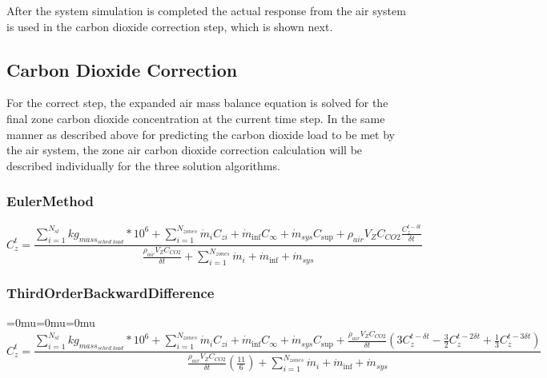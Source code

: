 After the system simulation is completed the actual response from the air system is used in the carbon dioxide correction step, which is shown next.

\subsection{Carbon Dioxide Correction}\label{carbon-dioxide-correction}

For the correct step, the expanded air mass balance equation is solved for the final zone carbon dioxide concentration at the current time step. In the same manner as described above for predicting the carbon dioxide load to be met by the air system, the zone air carbon dioxide correction calculation will be described individually for the three solution algorithms.

\subsubsection{EulerMethod}\label{eulermethod-1}

\begin{equation}
C_z^t = \frac{{\sum\limits_{i = 1}^{{N_{sl}}} {k{g_{mas{s_{sched\;load}}}}*{{10}^6}}  + \sum\limits_{i = 1}^{{N_{zones}}} {{{\dot m}_i}} {C_{zi}} + {{\dot m}_{\inf }}{C_\infty } + {{\dot m}_{sys}}{C_{\sup }} + {\rho_{air}}{V_Z}{C_{CO2}}\frac{{C_z^{t - \delta t}}}{{\delta t}}}}{{\frac{{{\rho_{air}}{V_Z}{C_{CO2}}}}{{\delta t}} + \sum\limits_{i = 1}^{{N_{zones}}} {{{\dot m}_i}}  + {{\dot m}_{\inf }} + {{\dot m}_{sys}}}}
\end{equation}

\subsubsection{ThirdOrderBackwardDifference}\label{thirdorderbackwarddifference-1}

{\medmuskip=0mu\thinmuskip=0mu\thickmuskip=0mu\nulldelimiterspace=0pt\scriptspace=0pt
\begin{equation}
C_z^t = \frac{{\sum\limits_{i = 1}^{{N_{sl}}} {k{g_{mas{s_{sched\;load}}}}*{{10}^6}}  + \sum\limits_{i = 1}^{{N_{zones}}} {{{\dot m}_i}} {C_{zi}} + {{\dot m}_{\inf }}{C_\infty } + {{\dot m}_{sys}}{C_{\sup }} + \frac{{{\rho_{air}}{V_Z}{C_{CO2}}}}{{\delta t}}(3C_z^{t - \delta t} - \frac{3}{2}C_z^{t - 2\delta t} + \frac{1}{3}C_z^{t - 3\delta t})}}{{\frac{{{\rho_{air}}{V_Z}{C_{CO2}}}}{{\delta t}}\left( {\frac{{11}}{6}} \right) + \sum\limits_{i = 1}^{{N_{zones}}} {{{\dot m}_i}}  + {{\dot m}_{\inf }} + {{\dot m}_{sys}}}}
\end{equation}}

